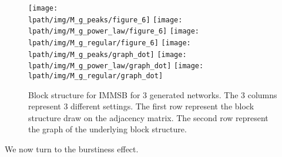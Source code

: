 \begin{figure}[h]
	\centering
	
	\texttt{[image: \\lpath/img/M\_g\_peaks/figure\_6]}
	\endminipage
	\texttt{[image: \\lpath/img/M\_g\_power\_law/figure\_6]}
	\endminipage
	\texttt{[image: \\lpath/img/M\_g\_regular/figure\_6]}
	\endminipage
    \vspace{0.3cm}
	\texttt{[image: \\lpath/img/M\_g\_peaks/graph\_dot]}
	\endminipage
    \hspace{1cm}\texttt{[image: \\lpath/img/M\_g\_power\_law/graph\_dot]} 
	\endminipage
	\texttt{[image: \\lpath/img/M\_g\_regular/graph\_dot]}
	\endminipage
	\caption{Block structure for IMMSB for 3 generated networks. The 3 columns represent 3 different settings. The first row represent the block structure draw on the adjacency matrix. The second row represent the graph of the underlying block structure.}
	\label{fig:gen_blocks_mmsb}
\end{figure}


 We now turn to the burstiness effect.
